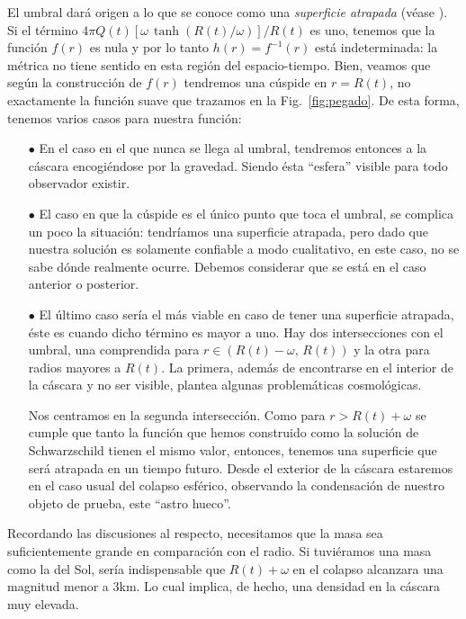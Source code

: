 \documentclass[12pt]{article}
\begin{document}
El umbral dará origen a lo que se conoce como una \textit{superficie atrapada} (véase \cite{Castaneda04}). Si el término $4\pi Q(t)\left[\omega\,\tanh\left(R(t)/\omega\right)\right]/R(t)$ es uno, tenemos que la función $f(r)$ es nula y por lo tanto $h(r) = f^{-1}(r)$ está indeterminada: la métrica no tiene sentido en esta región del espacio-tiempo. Bien, veamos que según la construcción de $f(r)$ tendremos una cúspide en $r = R(t)$, no exactamente la función suave que trazamos en la Fig.~\ref{fig:pegado}. De esta forma, tenemos varios casos para nuestra función:
\begin{itemize}
 \item[$\bullet$] En el caso en el que nunca se llega al umbral, tendremos entonces a la cáscara encogiéndose por la gravedad. Siendo ésta ``esfera'' visible para todo observador existir.
 
 \item[$\bullet$] El caso en que la cúspide es el único punto que toca el umbral, se complica un poco la situación: tendríamos una superficie atrapada, pero dado que nuestra solución es solamente confiable a modo cualitativo, en este caso, no se sabe dónde realmente ocurre. Debemos considerar que se está en el caso anterior o posterior.
 
 \item[$\bullet$] El último caso sería el más viable en caso de tener una superficie atrapada, éste es cuando dicho término es mayor a uno. Hay dos intersecciones con el umbral, una comprendida para $r \in \left(R(t) - \omega,\, R(t)\right)$ y la otra para radios mayores a $R(t)$. La primera, además de encontrarse en el interior de la cáscara y no ser visible, plantea algunas problemáticas cosmológicas.
 
 Nos centramos en la segunda intersección. Como para $r > R(t) + \omega$ se cumple que tanto la función que hemos construido como la solución de Schwarzschild tienen el mismo valor, entonces, tenemos una superficie que será atrapada en un tiempo futuro. Desde el exterior de la cáscara estaremos en el caso usual del colapso esférico, observando la condensación de nuestro objeto de prueba, este ``astro hueco''.
\end{itemize}
Recordando las discusiones al respecto, necesitamos que la masa sea suficientemente grande en comparación con el radio. Si tuviéramos una masa como la del Sol, sería indispensable que $R(t) + \omega$ en el colapso alcanzara una magnitud menor a 3km. Lo cual implica, de hecho, una densidad en la cáscara muy elevada.
\end{document}
